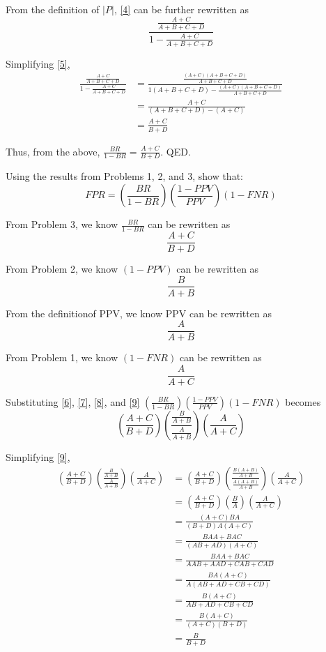 \documentclass{cisXXX} %
\begin{document}
From the definition of $|P|$, \eqref{4} can be further rewritten as
\begin{equation}
\label{5} \frac{\frac{A+C}{A+B+C+D}}{1-\frac{A+C}{A+B+C+D}}
\end{equation}

Simplifying \eqref{5},
\begin{align*}
\frac{\frac{A+C}{A+B+C+D}}{1-\frac{A+C}{A+B+C+D}} &= \frac{\frac{(A+C)(A+B+C+D)}{A+B+C+D}}{1(A+B+C+D)-\frac{(A+C)(A+B+C+D)}{A+B+C+D}}\\
&= \frac{A+C}{(A+B+C+D) - (A+C)}\\
&= \frac{A+C}{B+D}
\end{align*}

Thus, from the above, $\frac{BR}{1-BR} = \frac{A+C}{B+D}$. QED.

\HWproblem
Using the results from Problems 1, 2, and 3, show that:
$$FPR = (\frac{BR}{1-BR})(\frac{1-PPV}{PPV})(1 -FNR)$$

From Problem 3, we know $\frac{BR}{1-BR}$ can be rewritten as
\begin{equation}
\label{6} \frac{A+C}{B+D}
\end{equation}

From Problem 2, we know $(1-PPV)$ can be rewritten as
\begin{equation}
\label{7} \frac{B}{A+B}
\end{equation}

From the definitionof PPV, we know PPV can be rewritten as
\begin{equation}
\label{8} \frac{A}{A+B}
\end{equation}

From Problem 1, we know $(1-FNR)$ can be rewritten as
\begin{equation}
\label{8} \frac{A}{A+C}
\end{equation}

Substituting \eqref{6}, \eqref{7}, \eqref{8}, and \eqref{9} $(\frac{BR}{1-BR})(\frac{1-PPV}{PPV})(1 -FNR)$ becomes
\begin{equation}
\label{9} (\frac{A+C}{B+D})(\frac{\frac{B}{A+B}}{\frac{A}{A+B}})(\frac{A}{A+C})
\end{equation}

Simplifying \eqref{9},
\begin{align*}
(\frac{A+C}{B+D})(\frac{\frac{B}{A+B}}{\frac{A}{A+B}})(\frac{A}{A+C}) &= (\frac{A+C}{B+D})(\frac{\frac{B(A+B)}{A+B}}{\frac{A(A+B)}{A+B}})(\frac{A}{A+C})\\
&= (\frac{A+C}{B+D})(\frac{B}{A})(\frac{A}{A+C})\\
&= \frac{(A+C)BA}{(B+D)A(A+C)}\\
&= \frac{BAA+BAC}{(AB+AD)(A+C)}\\
&= \frac{BAA+BAC}{AAB+AAD+CAB+CAD}\\
&= \frac{BA(A+C)}{A(AB+AD+CB+CD)}\\
&= \frac{B(A+C)}{AB+AD+CB+CD}\\
&= \frac{B(A+C)}{(A+C)(B+D)}\\
&= \frac{B}{B+D}
\end{align*}
\end{document}
